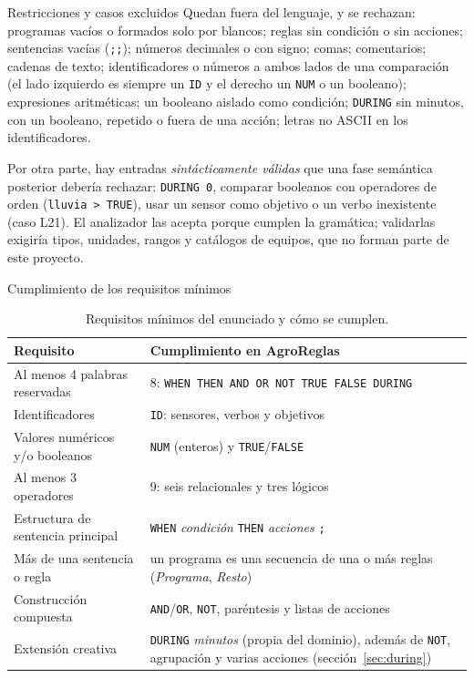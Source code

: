 \documentclass[11pt,letterpaper]{article}
\makeatletter
\renewcommand\subsection{\@startsection{subsection}{2}{\z@}{-2.6ex\@plus -1ex \@minus -.2ex}{1.0ex \@plus .2ex}%
  {\normalfont\large\bfseries}}
\newcommand{\T}[1]{\texttt{#1}}
\newcommand{\NT}[1]{\textit{#1}}
\newcommand{\cabeza}{\rowcolor{cabecera}}
\makeatother
\begin{document}
\subsection{Restricciones y casos excluidos}\label{sec:restricciones}
Quedan fuera del lenguaje, y se rechazan: programas vacíos o formados solo por blancos; reglas sin condición o
sin acciones; sentencias vacías (\T{;;}); números decimales o con signo; comas; comentarios; cadenas de texto;
identificadores o números a ambos lados de una comparación (el lado izquierdo es siempre un \T{ID} y el derecho un
\T{NUM} o un booleano); expresiones aritméticas; un booleano aislado como condición; \T{DURING} sin minutos, con
un booleano, repetido o fuera de una acción; letras no ASCII en los identificadores.

Por otra parte, hay entradas \emph{sintácticamente válidas} que una fase semántica posterior debería
rechazar: \T{DURING 0}, comparar booleanos con operadores de orden (\T{lluvia > TRUE}), usar un sensor como
objetivo o un verbo inexistente (caso L21). El analizador las acepta porque cumplen la gramática; validarlas
exigiría tipos, unidades, rangos y catálogos de equipos, que no forman parte de este proyecto.

\subsection{Cumplimiento de los requisitos mínimos}
\begin{longtable}{>{\raggedright}p{5.2cm}p{10.6cm}}
\caption{Requisitos mínimos del enunciado y cómo se cumplen.}\\
\hline\cabeza \textbf{Requisito} & \textbf{Cumplimiento en AgroReglas}\\\hline\endfirsthead
Al menos 4 palabras reservadas & 8: \T{WHEN THEN AND OR NOT TRUE FALSE DURING}\\
Identificadores & \T{ID}: sensores, verbos y objetivos\\
Valores numéricos y/o booleanos & \T{NUM} (enteros) y \T{TRUE}/\T{FALSE}\\
Al menos 3 operadores & 9: seis relacionales y tres lógicos\\
Estructura de sentencia principal & \T{WHEN} \textit{condición} \T{THEN} \textit{acciones} \T{;}\\
Más de una sentencia o regla & un programa es una secuencia de una o más reglas (\NT{Programa}, \NT{Resto})\\
Construcción compuesta & \T{AND}/\T{OR}, \T{NOT}, paréntesis y listas de acciones\\
Extensión creativa & \T{DURING} \textit{minutos} (propia del dominio), además de \T{NOT}, agrupación y varias acciones
(sección~\ref{sec:during})\\\hline
\end{longtable}
\end{document}
